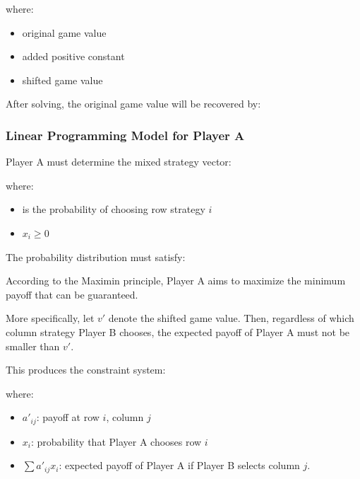\documentclass[12pt,a4paper]{article}
\begin{document}
\noindent{}

where:

\begin{itemize}
    \item original game value
    \item added positive constant
    \item shifted game value
\end{itemize}

After solving, the original game value will be recovered by:

\noindent{}
\subsubsection{Linear Programming Model for Player A}

Player A must determine the mixed strategy vector:

\noindent{}
where:

\begin{itemize}
    \item is the probability of choosing row strategy \(i\)
    \item \(x_i \ge 0\)
\end{itemize}

The probability distribution must satisfy:
\vspace{0.1cm}

\noindent{}

\vspace{0.1cm}
According to the Maximin principle, Player A aims to maximize the minimum payoff that can be guaranteed.

More specifically, let \(v'\) denote the shifted game value. Then, regardless of which column strategy Player B chooses, the expected payoff of Player A must not be smaller than \(v'\).

This produces the constraint system:
\vspace{0.1cm}

\noindent{}

where:

\begin{itemize}
    \item \(a'_{ij}\): payoff at row \(i\), column \(j\)
    \item \(x_i\): probability that Player A chooses row \(i\)
    \item \(\sum a'_{ij}x_i\): expected payoff of Player A if Player B selects column \(j\).
\end{itemize}
\end{document}

